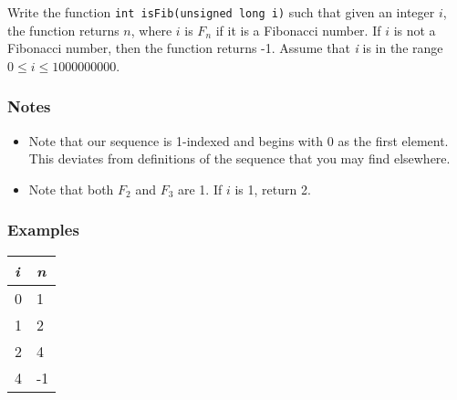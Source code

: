 \documentclass{article}
\begin{document}
Write the function \texttt{int isFib(unsigned long i)} such that given an integer $i$, the function returns $n$, where $i$ is $F_n$ if it is a Fibonacci number. 
If $i$ is not a Fibonacci number, then the function returns -1.
 Assume that {\it i} is in the range $ 0 \le i \le 1000000000$.

\subsubsection{Notes}
\begin{itemize}
  \item Note that our sequence is 1-indexed and begins with 0 as the first element. This deviates from definitions of the sequence that you may find elsewhere.
  \item Note that both $F_2$ and $F_3$ are 1. If $i$ is 1, return 2.
\end{itemize}

\subsubsection{Examples}

\begin{center}
  \label{fibexamples}
  \begin{tabular}{|l|l|}
    \hline
    {\it i} & {\it n} \\
    \hline
    0 & 1 \\
    1 & 2 \\
    2 & 4 \\
    4 & -1 \\
    \hline
  \end{tabular}
\end{center}
\end{document}

